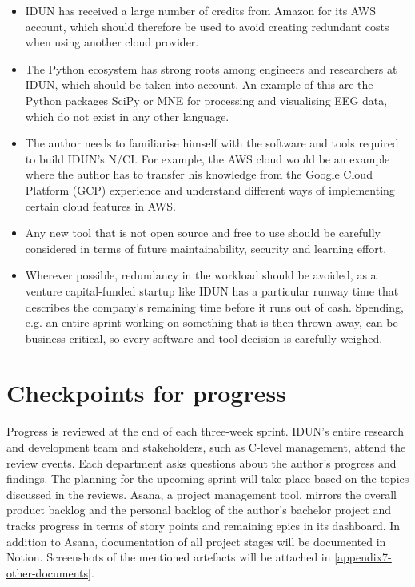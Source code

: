 \begin{itemize}
  \item IDUN has received a large number of credits from Amazon for its AWS account, which should therefore be used to avoid creating redundant costs when using another cloud provider.
  \item The Python ecosystem has strong roots among engineers and researchers at IDUN, which should be taken into account. An example of this are the Python packages SciPy or MNE for processing and visualising EEG data, which do not exist in any other language.
  \item The author needs to familiarise himself with the software and tools required to build IDUN's N/CI. For example, the AWS cloud would be an example where the author has to transfer his knowledge from the Google Cloud Platform (GCP) experience and understand different ways of implementing certain cloud features in AWS.
  \item Any new tool that is not open source and free to use should be carefully considered in terms of future maintainability, security and learning effort.
  \item Wherever possible, redundancy in the workload should be avoided, as a venture capital-funded startup like IDUN has a particular runway time that describes the company's remaining time before it runs out of cash. Spending, e.g. an entire sprint working on something that is then thrown away, can be business-critical, so every software and tool decision is carefully weighed.
\end{itemize}

\section{Checkpoints for progress}
\label{chapter3-checkpoints-for-progress}

Progress is reviewed at the end of each three-week sprint. IDUN's entire research and development team and stakeholders, such as C-level management, attend the review events. Each department asks questions about the author's progress and findings. The planning for the upcoming sprint will take place based on the topics discussed in the reviews. Asana, a project management tool, mirrors the overall product backlog and the personal backlog of the author's bachelor project and tracks progress in terms of story points and remaining epics in its dashboard. In addition to Asana, documentation of all project stages will be documented in Notion. Screenshots of the mentioned artefacts will be attached in \autoref{appendix7-other-documents}.

